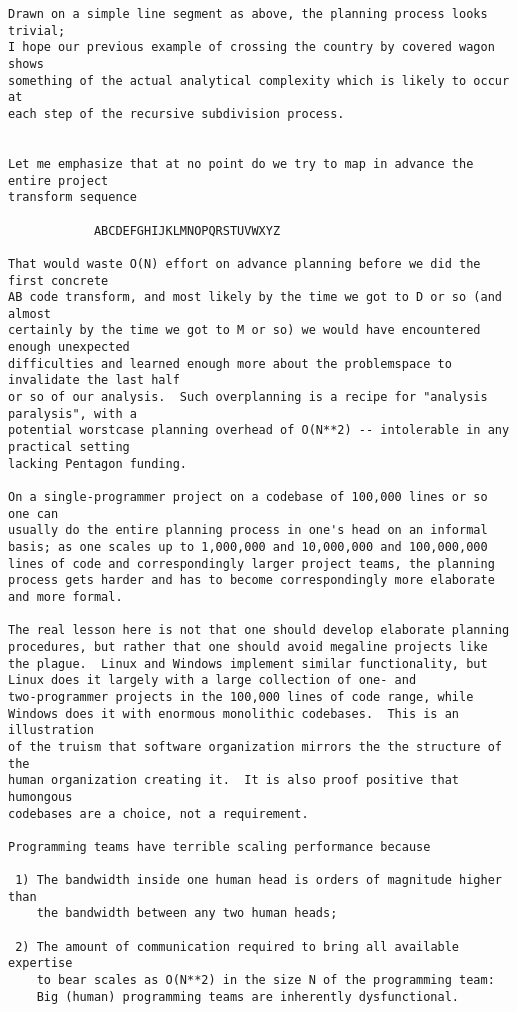 \begin{verbatim}
Drawn on a simple line segment as above, the planning process looks trivial;
I hope our previous example of crossing the country by covered wagon shows
something of the actual analytical complexity which is likely to occur at
each step of the recursive subdivision process.


Let me emphasize that at no point do we try to map in advance the entire project
transform sequence

            ABCDEFGHIJKLMNOPQRSTUVWXYZ

That would waste O(N) effort on advance planning before we did the first concrete
AB code transform, and most likely by the time we got to D or so (and almost
certainly by the time we got to M or so) we would have encountered enough unexpected
difficulties and learned enough more about the problemspace to invalidate the last half
or so of our analysis.  Such overplanning is a recipe for "analysis paralysis", with a
potential worstcase planning overhead of O(N**2) -- intolerable in any practical setting
lacking Pentagon funding.

On a single-programmer project on a codebase of 100,000 lines or so one can
usually do the entire planning process in one's head on an informal
basis; as one scales up to 1,000,000 and 10,000,000 and 100,000,000
lines of code and correspondingly larger project teams, the planning
process gets harder and has to become correspondingly more elaborate
and more formal.

The real lesson here is not that one should develop elaborate planning
procedures, but rather that one should avoid megaline projects like
the plague.  Linux and Windows implement similar functionality, but
Linux does it largely with a large collection of one- and
two-programmer projects in the 100,000 lines of code range, while
Windows does it with enormous monolithic codebases.  This is an illustration
of the truism that software organization mirrors the the structure of the
human organization creating it.  It is also proof positive that humongous
codebases are a choice, not a requirement.

Programming teams have terrible scaling performance because

 1) The bandwidth inside one human head is orders of magnitude higher than
    the bandwidth between any two human heads;

 2) The amount of communication required to bring all available expertise
    to bear scales as O(N**2) in the size N of the programming team:
    Big (human) programming teams are inherently dysfunctional.


\end{verbatim}
